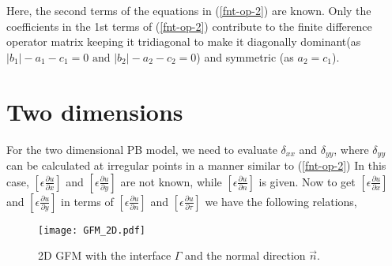 Here, the second terms of the equations in (\ref{fnt-op-2}) are known. Only the coefficients in the 1st terms of (\ref{fnt-op-2}) contribute to the finite difference operator matrix keeping it tridiagonal to make it diagonally dominant(as $|b_1|-a_1-c_1=0\text{ and } |b_2|-a_2-c_2=0$) and symmetric (as $a_2=c_1$).  

  
\section{Two dimensions}
For the two dimensional PB model, we need to evaluate $\delta_{xx}$ and $\delta_{yy}$, 
where $\delta_{yy}$ can be calculated at irregular points in a manner similar to (\ref{fnt-op-2}) 
In this case,  $\left[ \epsilon \frac{\partial u}{\partial x} \right]$ and $\left[ \epsilon \frac{\partial u}{\partial y} \right]$ are not known, while $\left[ \epsilon \frac{\partial u}{\partial n} \right]$ is given. Now to get $\left[ \epsilon \frac{\partial u}{\partial x} \right]$ and $\left[ \epsilon \frac{\partial u}{\partial y} \right]$ in terms of $\left[ \epsilon \frac{\partial u}{\partial n} \right]$ and $\left[ \epsilon \frac{\partial u}{\partial \tau} \right]$ we have the following relations,  
\begin{figure}[ht]
\begin{center}
\texttt{[image: GFM\_2D.pdf]}
\caption{2D GFM with the interface $\Gamma$ and the normal direction $\vec{n}$.}
\label{fig_gfm_2D}
\end{center}
\end{figure}

